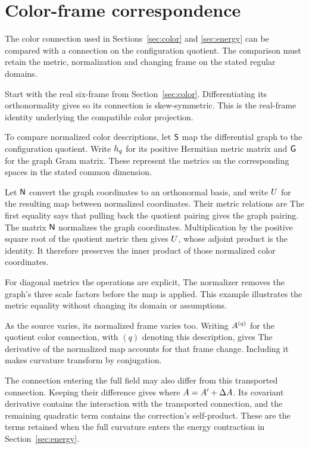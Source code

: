 \section{Color-frame correspondence}
\label{app:color-correspondence}
The color connection used in Sections~\ref{sec:color} and \ref{sec:energy} can be compared with a connection on the configuration quotient. The comparison must retain the metric, normalization and changing frame on the stated regular domains.

Start with the real six-frame from Section~\ref{sec:color}. Differentiating its orthonormality gives
\AlgebraFrameSkewDisplay
so its connection is skew-symmetric. This is the real-frame identity underlying the compatible color projection.

To compare normalized color descriptions, let $\mathsf S$ map the differential graph to the configuration quotient. Write $h_q$ for its positive Hermitian metric matrix and $\mathsf G$ for the graph Gram matrix. These represent the metrics on the corresponding spaces in the stated common dimension.

Let $\mathsf N$ convert the graph coordinates to an orthonormal basis, and write $U$ for the resulting map between normalized coordinates. Their metric relations are
\SpectrumActualStateMapDisplay
The first equality says that pulling back the quotient pairing gives the graph pairing. The matrix $\mathsf N$ normalizes the graph coordinates. Multiplication by the positive square root of the quotient metric then gives $U$, whose adjoint product is the identity. It therefore preserves the inner product of those normalized color coordinates.

For diagonal metrics the operations are explicit,
\SpectrumNormalizationExampleDisplay
The normalizer removes the graph's three scale factors before the map is applied. This example illustrates the metric equality without changing its domain or assumptions.

As the source varies, its normalized frame varies too. Writing $A^{(q)}$ for the quotient color connection, with $(q)$ denoting this description, gives
\SpectrumActualConnectionDisplay
The derivative of the normalized map accounts for that frame change. Including it makes curvature transform by conjugation.

The connection entering the full field may also differ from this transported connection. Keeping their difference gives
\SpectrumActualCurvatureDisplay
where $A=A'+\Delta A$. Its covariant derivative contains the interaction with the transported connection,
\SpectrumCorrectionExampleDisplay
and the remaining quadratic term contains the correction's self-product. These are the terms retained when the full curvature enters the energy contraction in Section~\ref{sec:energy}.


